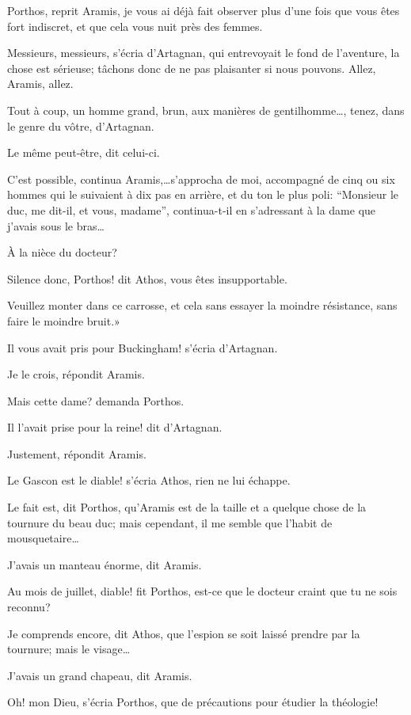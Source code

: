 \speak  Porthos, reprit Aramis, je vous ai déjà fait observer plus d'une fois que vous êtes fort indiscret, et que cela vous nuit près des femmes. 

\speak  Messieurs, messieurs, s'écria d'Artagnan, qui entrevoyait le fond de l'aventure, la chose est sérieuse; tâchons donc de ne pas plaisanter si nous pouvons. Allez, Aramis, allez. 

\speak  Tout à coup, un homme grand, brun, aux manières de gentilhomme\dots, tenez, dans le genre du vôtre, d'Artagnan. 

\speak  Le même peut-être, dit celui-ci. 

\speak  C'est possible, continua Aramis,\dots s'approcha de moi, accompagné de cinq ou six hommes qui le suivaient à dix pas en arrière, et du ton le plus poli: “Monsieur le duc, me dit-il, et vous, madame”, continua-t-il en s'adressant à la dame que j'avais sous le bras\dots 

\speak  À la nièce du docteur? 

\speak  Silence donc, Porthos! dit Athos, vous êtes insupportable. 

\speak  Veuillez monter dans ce carrosse, et cela sans essayer la moindre résistance, sans faire le moindre bruit.» 

\speak  Il vous avait pris pour Buckingham! s'écria d'Artagnan. 

\speak  Je le crois, répondit Aramis. 

\speak  Mais cette dame? demanda Porthos. 

\speak  Il l'avait prise pour la reine! dit d'Artagnan. 

\speak  Justement, répondit Aramis. 

\speak  Le Gascon est le diable! s'écria Athos, rien ne lui échappe. 

\speak  Le fait est, dit Porthos, qu'Aramis est de la taille et a quelque chose de la tournure du beau duc; mais cependant, il me semble que l'habit de mousquetaire\dots 

\speak  J'avais un manteau énorme, dit Aramis. 

\speak  Au mois de juillet, diable! fit Porthos, est-ce que le docteur craint que tu ne sois reconnu? 

\speak  Je comprends encore, dit Athos, que l'espion se soit laissé prendre par la tournure; mais le visage\dots 

\speak  J'avais un grand chapeau, dit Aramis. 

\speak  Oh! mon Dieu, s'écria Porthos, que de précautions pour étudier la théologie! 

